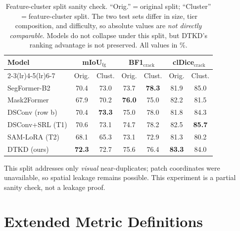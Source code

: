\documentclass[review,authoryear]{elsarticle}
\begin{document}
\begin{table}[t]
\centering
\caption{Feature-cluster split sanity check. ``Orig.''$=$original split; ``Cluster''$=$feature-cluster split. The two test sets differ in size, tier composition, and difficulty, so absolute values are \emph{not directly comparable}. Models do not collapse under this split, but DTKD's ranking advantage is not preserved. All values in \%.}
\label{tab:supp_group_split}
\setlength{\tabcolsep}{4pt}
\begin{tabular}{lcccccc}
\toprule
\multirow{2}{*}{Model} & \multicolumn{2}{c}{mIoU$_{\text{fg}}$} & \multicolumn{2}{c}{BF1$_{\text{crack}}$} & \multicolumn{2}{c}{clDice$_{\text{crack}}$} \\
\cmidrule(lr){2-3}\cmidrule(lr){4-5}\cmidrule(lr){6-7}
 & Orig. & Clust. & Orig. & Clust. & Orig. & Clust. \\
\midrule
SegFormer-B2   & 70.4 & 73.0 & 73.7 & \textbf{78.3} & 81.9 & 85.0 \\
Mask2Former    & 67.9 & 70.2 & \textbf{76.0} & 75.0 & 82.2 & 81.5 \\
DSConv (row b) & 70.4 & \textbf{73.3} & 75.0 & 78.0 & 81.8 & 84.3 \\
DSConv+SRL (T1) & 70.6 & 73.1 & 74.7 & 78.2 & 82.5 & \textbf{85.7} \\
SAM-LoRA (T2)  & 68.1 & 65.3 & 73.1 & 72.9 & 81.3 & 80.2 \\
DTKD (ours)    & \textbf{72.3} & 72.7 & 75.6 & 76.4 & \textbf{83.3} & 84.0 \\
\bottomrule
\end{tabular}
\end{table}

This split addresses only \emph{visual} near-duplicates; patch coordinates were unavailable, so spatial leakage remains possible. This experiment is a partial sanity check, not a leakage proof.

\section{Extended Metric Definitions}
\label{sec:supp_metrics}
\end{document}
